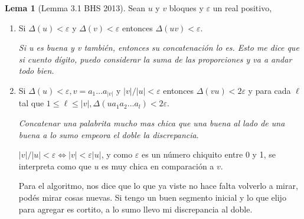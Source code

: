 \documentclass{report}
\theoremstyle{definition} %
\newtheorem{lemma}{Lema}[chapter]
\begin{document}
\begin{lemma}[Lemma 3.1 BHS 2013]
    Sean $u$ y $v$ bloques y $\varepsilon$ un real positivo,

    \begin{enumerate}
        \item Si $\Delta(u) < \varepsilon$ y $\Delta(v) < \varepsilon$ entonces
        $\Delta(uv) < \varepsilon$.

        \textit{Si u es buena y v también, entonces su concatenación lo es.
        Esto me dice que si cuento dígito, puedo considerar la suma de las
        proporciones y va a andar todo bien.}

        \item Si $\Delta(u) < \varepsilon, v = a_1 \dots a_{|v|}$ y $|v|/|u| <
        \varepsilon$ entonces $\Delta(vu) < 2\varepsilon$ y para cada $\ell$ tal
        que $1 \leq \ell \leq |v|, \Delta(ua_1a_2\dots a_l) < 2\varepsilon$.

        \textit{Concatenar una palabrita mucho mas chica que una buena al lado
        de una buena a lo sumo empeora el doble la discrepancia}.
        
        $|v|/|u| < \varepsilon \Leftrightarrow |v| < \varepsilon|u|$, y como
        $\varepsilon$ es un número chiquito entre 0 y 1, se interpreta como que
        $u$ es muy chica en comparación a $v$.

        Para el algoritmo, nos dice que lo que ya viste no hace falta volverlo a
        mirar, podés mirar cosas nuevas. Si tengo un buen segmento inicial y lo
        que elijo para agregar es cortito, a lo sumo llevo mi discrepancia al doble.
    \end{enumerate}
\end{lemma}
\end{document}

